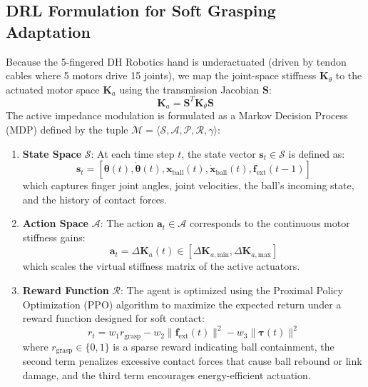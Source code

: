 \documentclass[letterpaper,journal]{IEEEtran}
\begin{document}
\subsection{DRL Formulation for Soft Grasping Adaptation}
Because the 5-fingered DH Robotics hand is underactuated (driven by tendon cables where 5 motors drive 15 joints), we map the joint-space stiffness $\mathbf{K}_\theta$ to the actuated motor space $\mathbf{K}_a$ using the transmission Jacobian $\mathbf{S}$:
\begin{equation}
\mathbf{K}_a = \mathbf{S}^T \mathbf{K}_\theta \mathbf{S}
\end{equation}
The active impedance modulation is formulated as a Markov Decision Process (MDP) defined by the tuple $\mathcal{M} = \langle \mathcal{S}, \mathcal{A}, \mathcal{P}, \mathcal{R}, \gamma \rangle$:
\begin{enumerate}
    \item \textbf{State Space} $\mathcal{S}$: At each time step $t$, the state vector $\mathbf{s}_t \in \mathcal{S}$ is defined as:
    \begin{equation}
    \mathbf{s}_t = \left[ \boldsymbol{\theta}(t), \dot{\boldsymbol{\theta}}(t), \mathbf{x}_{\text{ball}}(t), \dot{\mathbf{x}}_{\text{ball}}(t), \mathbf{f}_{\text{ext}}(t-1) \right]
    \end{equation}
    which captures finger joint angles, joint velocities, the ball's incoming state, and the history of contact forces.
    \item \textbf{Action Space} $\mathcal{A}$: The action $\mathbf{a}_t \in \mathcal{A}$ corresponds to the continuous motor stiffness gains:
    \begin{equation}
    \mathbf{a}_t = \Delta \mathbf{K}_{a}(t) \in [\Delta \mathbf{K}_{a,\text{min}}, \Delta \mathbf{K}_{a,\text{max}}]
    \end{equation}
    which scales the virtual stiffness matrix of the active actuators.
    \item \textbf{Reward Function} $\mathcal{R}$: The agent is optimized using the Proximal Policy Optimization (PPO) algorithm to maximize the expected return under a reward function designed for soft contact:
    \begin{equation}
    r_t = w_1 r_{\text{grasp}} - w_2 \|\mathbf{f}_{\text{ext}}(t)\|^2 - w_3 \|\boldsymbol{\tau}(t)\|^2
    \end{equation}
    where $r_{\text{grasp}} \in \{0, 1\}$ is a sparse reward indicating ball containment, the second term penalizes excessive contact forces that cause ball rebound or link damage, and the third term encourages energy-efficient actuation.
\end{enumerate}
\end{document}
